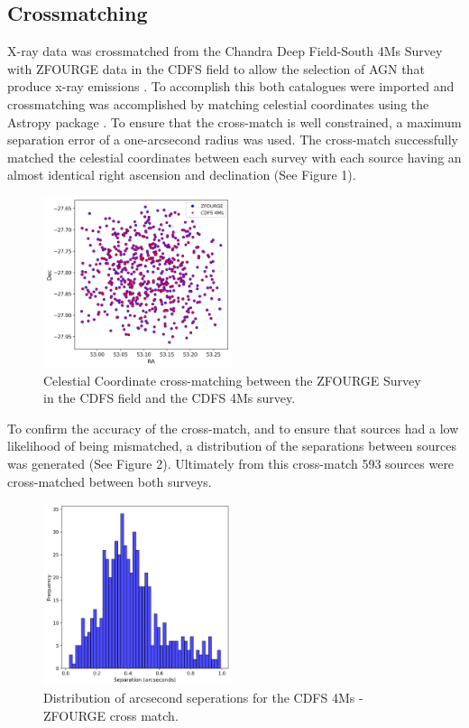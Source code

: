 \documentclass[11pt]{iopart}
\begin{document}
\subsection{Crossmatching}
X-ray data was crossmatched from the Chandra Deep Field-South 4Ms Survey \cite{xue_chandra_2011} with ZFOURGE data in the CDFS field to allow the selection of AGN that produce x-ray emissions \cite{szokoly_chandra_2004}. To accomplish this both catalogues were imported and crossmatching was accomplished by matching celestial coordinates using the Astropy package \cite{the_astropy_collaboration_astropy_2013}. To ensure that the cross-match is well constrained, a maximum separation error of a one-arcsecond radius was used. The cross-match successfully matched the celestial coordinates between each survey with each source having an almost identical right ascension and declination (See Figure 1).
\begin{figure}[h]
  \centering
  \includegraphics[width=0.49\textwidth]{plots/CDFS_4Ms_Xray_ZFOURGE_XMatch.png}
  \caption{Celestial Coordinate cross-matching between the ZFOURGE Survey in the CDFS field and the CDFS 4Ms survey.}
  \label{fig:Crossmatch}
\end{figure}
To confirm the accuracy of the cross-match, and to ensure that sources had a low likelihood of being mismatched, a distribution of the separations between sources was generated (See Figure 2). Ultimately from this cross-match 593 sources were cross-matched between both surveys. 
\begin{figure}[h]
  \centering
  \includegraphics[width=0.49\textwidth]{plots/CDFS_4Ms_Xray_Sep.png}
  \caption{Distribution of arcsecond seperations for the CDFS 4Ms - ZFOURGE cross match.}
  \label{fig:ArcsecondSep}
\end{figure}
\end{document}
